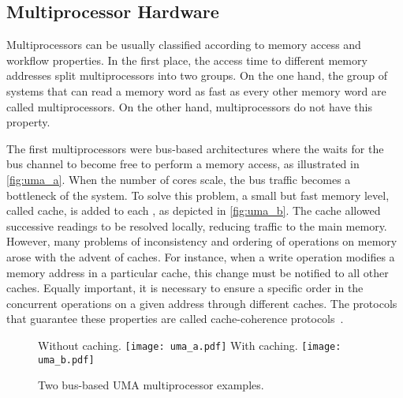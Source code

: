 		\subsection{Multiprocessor Hardware}
		\label{sec.multiprocessor-hw}

			Multiprocessors can be usually classified according
			to memory access
			and workflow properties.
			In the first place, the access time to different memory addresses
			split multiprocessors into two groups.
			On the one hand, the group of systems that can read a memory word
			as fast as every other memory word are called \uma multiprocessors.
			On the other hand, \numa multiprocessors do not have this property.

			The first \uma multiprocessors were bus-based architectures where
			the \cpu waits for the bus channel to become free to perform a memory
			access, as illustrated in \autoref{fig:uma_a}.
			When the number of cores scale, the bus traffic becomes a
			bottleneck of the system.
			To solve this problem, a small but fast memory level, called cache,
			is added to each \cpu, as depicted in \autoref{fig:uma_b}.
			The cache allowed successive readings to be resolved locally,
			reducing traffic to the main memory.
			However, many problems of inconsistency and ordering of operations
			on memory arose with the advent of caches.
			For instance, when a write operation modifies a memory address in
			a particular cache, this change must be notified to all other caches.
			Equally important, it is necessary to ensure a specific order in
			the concurrent operations on a given address through different caches.
			The protocols that guarantee these properties are called cache-coherence
			protocols~\cite{tanenbaum:4ed}.

			\begin{figure}[!tb]
				\centering%
				\caption{Two bus-based UMA multiprocessor examples.}%
				\label{fig:uma}%

					{Without caching.}%
					{\texttt{[image: uma\_a.pdf]}}%
				\hspace{1.5cm}%
					{With caching.}%
					{\texttt{[image: uma\_b.pdf]}}%

			\end{figure}

